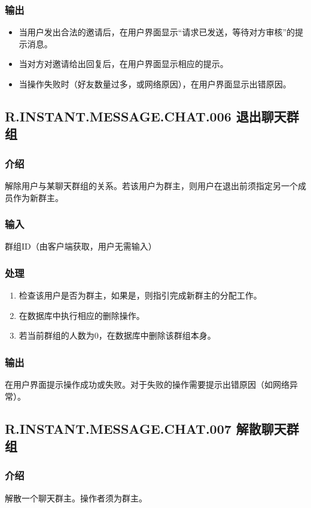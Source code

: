 \subsubsection{输出}
\begin{itemize}
	\item 当用户发出合法的邀请后，在用户界面显示“请求已发送，等待对方审核”的提示消息。
	\item 当对方对邀请给出回复后，在用户界面显示相应的提示。
	\item 当操作失败时（好友数量过多，或网络原因），在用户界面显示出错原因。
\end{itemize}

\subsection{R.INSTANT.MESSAGE.CHAT.006 退出聊天群组}
\subsubsection{介绍}
解除用户与某聊天群组的关系。若该用户为群主，则用户在退出前须指定另一个成员作为新群主。
\subsubsection{输入}
群组ID（由客户端获取，用户无需输入）
\subsubsection{处理}
\begin{enumerate}
	\item 检查该用户是否为群主，如果是，则指引完成新群主的分配工作。
	\item 在数据库中执行相应的删除操作。
	\item 若当前群组的人数为0，在数据库中删除该群组本身。
\end{enumerate}
\subsubsection{输出}
在用户界面提示操作成功或失败。对于失败的操作需要提示出错原因（如网络异常）。
\subsection{R.INSTANT.MESSAGE.CHAT.007 解散聊天群组}
\subsubsection{介绍}
解散一个聊天群主。操作者须为群主。
